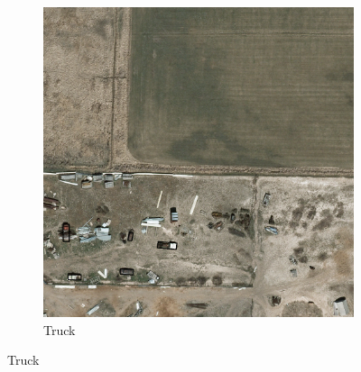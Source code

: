 \begin{figure}[h!]
\begin{subfigure}[t]{0.38\textwidth}
        \includegraphics[width=\linewidth]{images/015Results/01abb_vs_obb/comp_images/ground_truth_obb/212.png}
        \caption{Truck}
    \end{subfigure}
    

\end{figure}
